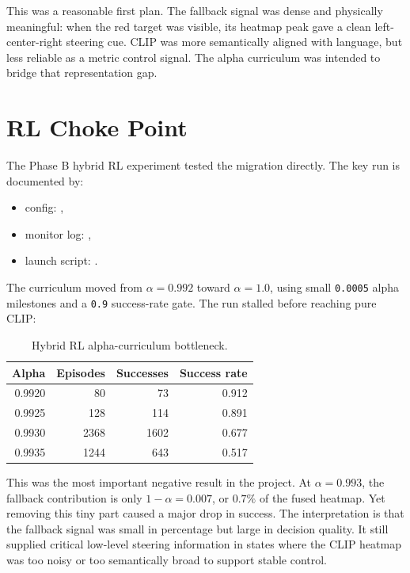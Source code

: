 \documentclass[11pt]{article}
\begin{document}
This was a reasonable first plan. The fallback signal was dense and physically
meaningful: when the red target was visible, its heatmap peak gave a clean
left-center-right steering cue. CLIP was more semantically aligned with
language, but less reliable as a metric control signal. The alpha curriculum
was intended to bridge that representation gap.

\section{RL Choke Point}

The Phase B hybrid RL experiment tested the migration directly. The key run is
documented by:

\begin{itemize}
  \item config: ,
  \item monitor log: ,
  \item launch script: .
\end{itemize}

The curriculum moved from \(\alpha = 0.992\) toward \(\alpha = 1.0\), using
small \texttt{0.0005} alpha milestones and a \texttt{0.9} success-rate gate.
The run stalled before reaching pure CLIP:

\begin{table}[htbp]
\centering
\caption{Hybrid RL alpha-curriculum bottleneck.}
\begin{tabular}{rrrr}
\toprule
\textbf{Alpha} & \textbf{Episodes} & \textbf{Successes} & \textbf{Success rate} \\
\midrule
0.9920 & 80 & 73 & 0.912 \\
0.9925 & 128 & 114 & 0.891 \\
0.9930 & 2368 & 1602 & 0.677 \\
0.9935 & 1244 & 643 & 0.517 \\
\bottomrule
\end{tabular}
\label{tab:alpha}
\end{table}

This was the most important negative result in the project. At
\(\alpha = 0.993\), the fallback contribution is only \(1 - \alpha = 0.007\),
or \(0.7\%\) of the fused heatmap. Yet removing this tiny part caused a major
drop in success. The interpretation is that the fallback signal was small in
percentage but large in decision quality. It still supplied critical
low-level steering information in states where the CLIP heatmap was too noisy
or too semantically broad to support stable control.
\end{document}
